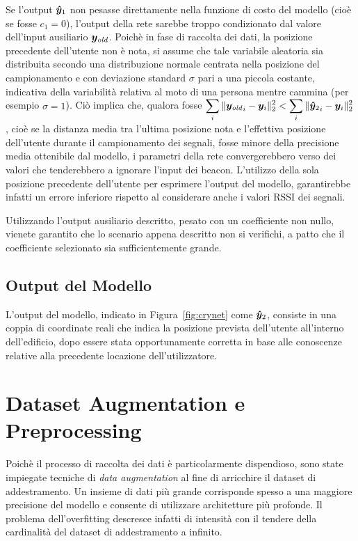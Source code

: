 Se l'output \(\bm\hat{\bm y}_1\) non pesasse direttamente nella funzione di costo
del modello (cioè se fosse \(c_1 = 0\)), l'output della rete sarebbe troppo
condizionato dal valore dell'input ausiliario \(\bm y_{\mathit{old}}\). Poichè in fase di
raccolta dei dati, la posizione precedente dell'utente non è nota, si assume
che tale variabile aleatoria sia distribuita secondo una distribuzione normale
centrata nella posizione del campionamento e con deviazione standard \(\sigma\)
pari a una piccola costante, indicativa della variabilità relativa al moto di
una persona mentre cammina (per esempio \( \sigma = 1 \)). Ciò implica che,
qualora fosse \(\displaystyle \sum_i\| {\bm y_{\mathit{old}}}_i - \bm y_i \|^2_2 < \sum_i \|
  {{}\bm\hat{\bm y}_2}_{i} - \bm y_i\|^2_2 \), cioè se la distanza media tra l'ultima
posizione nota e l'effettiva posizione dell'utente durante il campionamento dei
segnali, fosse minore della precisione media ottenibile dal modello, i
parametri della rete convergerebbero verso dei valori che tenderebbero a
ignorare l'input dei beacon. L'utilizzo della sola posizione precedente
dell'utente per esprimere l'output del modello, garantirebbe infatti un errore
inferiore rispetto al considerare anche i valori RSSI dei segnali.

Utilizzando l'output ausiliario descritto, pesato con un coefficiente non
nullo, vienete garantito che lo scenario appena descritto non si verifichi, a patto
che il coefficiente selezionato sia sufficientemente grande.


\subsection{Output del Modello}
L'output del modello, indicato in Figura~\ref{fig:crynet} come \(\bm\hat{\bm y}_2\),
consiste in una coppia di coordinate reali che indica la posizione prevista
dell'utente all'interno dell'edificio, dopo essere stata opportunamente
corretta in base alle conoscenze relative alla precedente locazione
dell'utilizzatore.
\section{Dataset Augmentation e Preprocessing}
Poichè il processo di raccolta dei dati è particolarmente dispendioso, sono
state impiegate tecniche di \emph{data augmentation} al fine di arricchire il
dataset di addestramento. Un insieme di dati più grande corrisponde spesso a
una maggiore precisione del modello e consente di utilizzare architetture più
profonde. Il problema dell'overfitting descresce infatti di intensità con il
tendere della cardinalità del dataset di addestramento a infinito.

